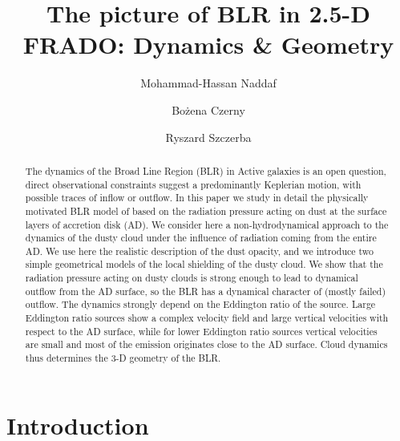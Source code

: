 \documentclass[twocolumn]{aastex62}
\begin{document}
\title{The picture of BLR in 2.5-D FRADO: Dynamics \& Geometry}


\author[0000-0002-7604-9594]{Mohammad-Hassan Naddaf}

\author[0000-0001-5848-4333]{Bo\.zena Czerny}

\author[0000-0003-2886-4460]{Ryszard Szczerba}


\begin{abstract}

The dynamics of the Broad Line Region (BLR) in Active galaxies is an open question, direct observational constraints suggest a predominantly Keplerian motion, with possible traces of inflow or outflow. In this paper we study in detail the physically motivated BLR model of \citet{Czerny2011} based on the radiation pressure acting on dust at the surface layers of accretion disk (AD). We consider here a non-hydrodynamical approach to the
dynamics of the dusty cloud under the influence of radiation coming from the entire AD. We use here the realistic description of the dust opacity, and we introduce two simple geometrical models of the local shielding of the dusty cloud. We show that the radiation pressure acting on dusty clouds is strong enough to lead to dynamical outflow from the AD surface, so the BLR has a dynamical character of (mostly failed) outflow. The dynamics strongly depend on the Eddington ratio of the source. Large Eddington ratio sources show a complex velocity field and large vertical velocities with respect to the AD surface, while for lower Eddington ratio sources vertical velocities are small and most of the emission originates close to the AD surface. Cloud dynamics thus determines the 3-D geometry of the BLR.
\end{abstract}


\section{Introduction} \label{sec:intro}
\end{document}
